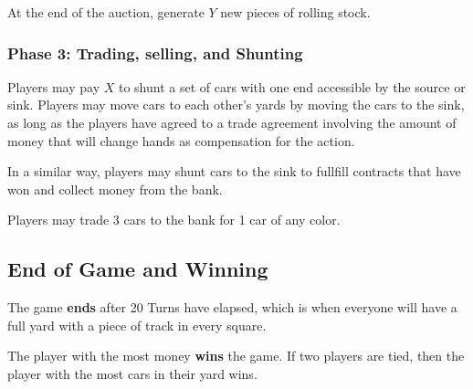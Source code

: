 \documentclass[12pt, letterpaper]{article}
\begin{document}
At the end of the auction, generate $Y$ new pieces of rolling stock.

\subsubsection{Phase 3: Trading, selling, and Shunting}

Players may pay $X$ to shunt a set of cars with one end accessible by the source or sink. Players may move cars to each other's yards by moving the cars to the sink, as long as the players have agreed to a trade agreement involving the amount of money that will change hands as compensation for the action.

In a similar way, players may shunt cars to the sink to fullfill contracts that have won and collect money from the bank.

Players may trade 3 cars to the bank for 1 car of any color.

\subsection{End of Game and Winning}
The game \textbf{ends} after 20 Turns have elapsed, which is when everyone will have a full yard with a piece of track in every square.

The player with the most money \textbf{wins} the game. If two players are tied, then the player with the most cars in their yard wins.

\end{document}
